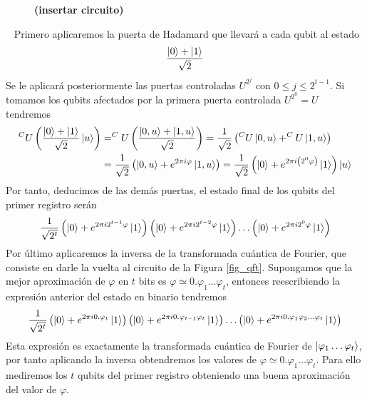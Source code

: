 \documentclass[a4paper]{article}
\numberwithin{equation}{section}
\begin{document}
\begin{figure}[h]
\textbf{(insertar circuito)}
\end{figure}\ \linebreak
Primero aplicaremos la puerta de Hadamard que llevará a cada qubit al estado
\begin{equation}
\frac{\ket{0} + \ket{1}}{\sqrt{2}}
\end{equation}
Se le aplicará posteriormente las puertas controladas $U^{2^j}$ con $0\leq j \leq 2^{t-1}$. Si tomamos los qubits afectados por la primera puerta controlada $U^{2^0} = U$ tendremos
\begin{equation}
\begin{split}
^CU \left( \frac{\ket{0} + \ket{1}}{\sqrt{2}} \ket{u} \right) 
&= 
^CU \left( \frac{\ket{0, u} + \ket{1, u}}{\sqrt{2}} \right)
=
\frac{1}{\sqrt{2}} \left( ^CU\ket{0, u} + ^CU\ket{1, u} \right)
\\ &=
\frac{1}{\sqrt{2}} \left( \ket{0, u} + e^{2\pi i \varphi}\ket{1, u} \right)
=
\frac{1}{\sqrt{2}} \left( \ket{0} + e^{2\pi i \left(2^0 \varphi\right)} \ket{1} \right) \ket{u}
\end{split}
\end{equation}
Por tanto, deducimos de las demás puertas, el estado final de los qubits del primer registro serán
\begin{equation}
\frac{1}{\sqrt{2^t}}
\left( \ket{0} + e^{2\pi i 2^{t-1}\varphi} \ket{1} \right)
\left( \ket{0} + e^{2\pi i 2^{t-2}\varphi} \ket{1} \right)
\ldots
\left( \ket{0} + e^{2\pi i 2^{0}\varphi} \ket{1} \right)
\end{equation}
Por último aplicaremos la inversa de la transformada cuántica de Fourier, que consiste en darle la vuelta al circuito de la Figura \ref{fig_qft}. Supongamos que la mejor aproximación de $\varphi$ en $t$ bits es $\varphi  \simeq 0.\varphi_1 \ldots \varphi_t$, entonces reescribiendo la expresión anterior del estado en binario tendremos
\begin{equation}
\frac{1}{\sqrt{2^t}}
\left( \ket{0} + e^{2\pi i 0.\varphi_t} \ket{1} \right)
\left( \ket{0} + e^{2\pi i 0.\varphi_{t-1}\varphi_t} \ket{1} \right)
\ldots
\left( \ket{0} + e^{2\pi i 0.\varphi_1\varphi_2\ldots\varphi_t} \ket{1} \right)
\end{equation}
Esta expresión es exactamente la transformada cuántica de Fourier de $\ket{\varphi_1\ldots\varphi_t}$, por tanto aplicando la inversa obtendremos los valores de $\varphi  \simeq 0.\varphi_1 \ldots \varphi_t$. Para ello mediremos los $t$ qubits del primer registro obteniendo una buena aproximación del valor de $\varphi$.\\
\end{document}
